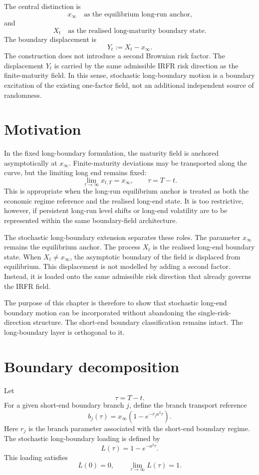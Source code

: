 \documentclass[11pt,oneside]{book}
\begin{document}
The central distinction is
\[
x_\infty
\quad\text{as the equilibrium long-run anchor,}
\]
and
\[
X_t
\quad\text{as the realised long-maturity boundary state.}
\]
The boundary displacement is
\[
Y_t := X_t-x_\infty.
\]
The construction does not introduce a second Brownian risk factor. The displacement \(Y_t\) is carried by the same admissible IRFR risk direction as the finite-maturity field. In this sense, stochastic long-boundary motion is a boundary excitation of the existing one-factor field, not an additional independent source of randomness.

\section{Motivation}

In the fixed long-boundary formulation, the maturity field is anchored asymptotically at \(x_\infty\). Finite-maturity deviations may be transported along the curve, but the limiting long end remains fixed:
\[
\lim_{\tau\to\infty} x_{t,T}=x_\infty,
\qquad \tau=T-t.
\]
This is appropriate when the long-run equilibrium anchor is treated as both the economic regime reference and the realised long-end state. It is too restrictive, however, if persistent long-run level shifts or long-end volatility are to be represented within the same boundary-field architecture.

The stochastic long-boundary extension separates these roles. The parameter \(x_\infty\) remains the equilibrium anchor. The process \(X_t\) is the realised long-end boundary state. When \(X_t\neq x_\infty\), the asymptotic boundary of the field is displaced from equilibrium. This displacement is not modelled by adding a second factor. Instead, it is loaded onto the same admissible risk direction that already governs the IRFR field.

The purpose of this chapter is therefore to show that stochastic long-end boundary motion can be incorporated without abandoning the single-risk-direction structure. The short-end boundary classification remains intact. The long-boundary layer is orthogonal to it.

\section{Boundary decomposition}

Let
\[
\tau=T-t.
\]
For a given short-end boundary branch \(j\), define the branch transport reference
\[
b_j(\tau)
=
x_\infty\left(1-e^{-r_j a^2\tau}\right).
\]
Here \(r_j\) is the branch parameter associated with the short-end boundary regime. The stochastic long-boundary loading is defined by
\[
L(\tau)
=
1-e^{-a^2\tau}.
\]
This loading satisfies
\[
L(0)=0,
\qquad
\lim_{\tau\to\infty}L(\tau)=1.
\]
\end{document}
